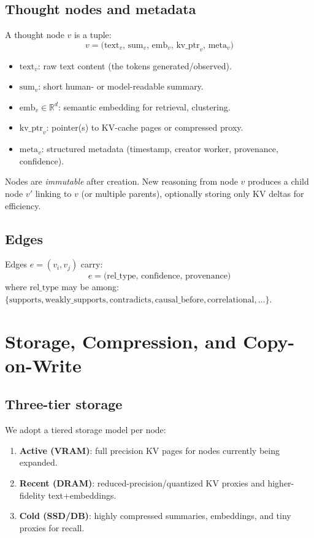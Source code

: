 \documentclass[11pt,onecolumn,letterpaper]{article}
\begin{document}
\subsection{Thought nodes and metadata}
A thought node \(v\) is a tuple:
\[
v = \big(\text{text}_v,\, \text{sum}_v,\, \text{emb}_v,\, \text{kv\_ptr}_v,\, \text{meta}_v\big)
\]
\begin{itemize}[nosep]
  \item \(\text{text}_v\): raw text content (the tokens generated/observed).
  \item \(\text{sum}_v\): short human- or model-readable summary.
  \item \(\text{emb}_v\in\mathbb{R}^d\): semantic embedding for retrieval, clustering.
  \item \(\text{kv\_ptr}_v\): pointer(s) to KV-cache pages or compressed proxy.
  \item \(\text{meta}_v\): structured metadata (timestamp, creator worker, provenance, confidence).
\end{itemize}

Nodes are \emph{immutable} after creation. New reasoning from node \(v\) produces a child node \(v'\) linking to \(v\) (or multiple parents), optionally storing only KV deltas for efficiency.

\subsection{Edges}
Edges \(e=(v_i,v_j)\) carry:
\[
e = \big(\text{rel\_type},\, \text{confidence},\, \text{provenance}\big)
\]
where \(\text{rel\_type}\) may be among: \(\{\text{supports}, \text{weakly\_supports}, \text{contradicts}, \text{causal\_before}, \text{correlational}, \ldots\}\).

\section{Storage, Compression, and Copy-on-Write}
\subsection{Three-tier storage}
We adopt a tiered storage model per node:
\begin{enumerate}[nosep]
  \item \textbf{Active (VRAM)}: full precision KV pages for nodes currently being expanded.
  \item \textbf{Recent (DRAM)}: reduced-precision/quantized KV proxies and higher-fidelity text+embeddings.
  \item \textbf{Cold (SSD/DB)}: highly compressed summaries, embeddings, and tiny proxies for recall.
\end{enumerate}
\end{document}
